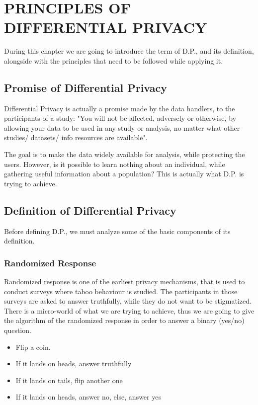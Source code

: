 \chapter{PRINCIPLES OF DIFFERENTIAL PRIVACY}

During this chapter we are going to introduce the term of D.P., and its definition, alongside with the principles that need to be followed while applying it.

\section{Promise of Differential Privacy}

\par Differential Privacy is actually a promise made by the data handlers, to the participants of a study: "You will not be affected, adversely or otherwise, by allowing your data to be used in any study or analysis, no matter what other studies/ datasets/ info resources are available". 
\par The goal is to make the data widely available for analysis, while protecting the users. However, is it possible to learn nothing about an individual, while gathering useful information about a population? This is actually what D.P. is trying to achieve.


\section{Definition of Differential Privacy}
Before defining D.P., we must analyze some of the basic components of its definition.

\subsection{Randomized Response}
Randomized response is one of the earliest privacy mechanisms, that is used to conduct surveys where taboo behaviour is studied. The participants in those surveys are asked to answer truthfully, while they do not want to be stigmatized. There is a micro-world of what we are trying to achieve, thus we are going to give the algorithm of the randomized response in order to answer a binary (yes/no) question.

\begin{itemize}
    \item Flip a coin.
    \item If it lands on heads, answer truthfully
    \item If it lands on tails, flip another one
    \item If it lands on heads, answer no, else, answer yes
\end{itemize}

